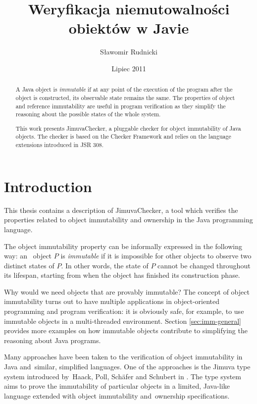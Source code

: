 \documentclass{pracamgr}
\author{Sławomir Rudnicki}
\title{Weryfikacja niemutowalności obiektów w Javie}
\date{Lipiec 2011}
\theoremstyle{break}
\theoremstyle{break}
\theoremstyle{break}
\begin{document}
\maketitle

\begin{abstract}
  A Java object is \emph{immutable} if at any point of the execution
  of the program after the object is constructed, its observable state
  remains the same. The properties of object and reference
  immutability are useful in program verification as they simplify the
  reasoning about the possible states of the whole system. 

  This work presents JimuvaChecker, a pluggable checker for object
  immutability of Java objects. The checker is based on the Checker
  Framework and relies on the language extensions introduced in
  JSR 308.
\end{abstract}

\tableofcontents

\chapter{Introduction}
\label{chap:intro}

This thesis contains a description of JimuvaChecker, a tool which
verifies the properties related to object immutability and ownership
in the Java programming language.

The object immutability property can be informally expressed in the
following way: an~ object $P$ is \emph{immutable} if it is impossible
for other objects to observe two distinct states of $P$. In other
words, the state of $P$ cannot be changed throughout its lifespan,
starting from when the object has finished its construction phase.

Why would we need objects that are provably immutable? The concept of
object immutability turns out to have multiple applications in
object-oriented programming and program verification: it is obviously
safe, for example, to use immutable objects in a multi-threaded
environment. Section \ref{sec:imm-general} provides more examples on
how immutable objects contribute to simplifying the reasoning about
Java programs.

Many approaches have been taken to the verification of object
immutability in Java and~similar, simplified languages. One of the
approaches is the Jimuva type system introduced by~Haack, Poll,
Schäfer and Schubert in \cite{haack}. The type system aims to prove
the im\-mu\-ta\-bi\-li\-ty of particular objects in a limited,
Java-like language extended with object immutability and~ownership
specifications.
\end{document}
